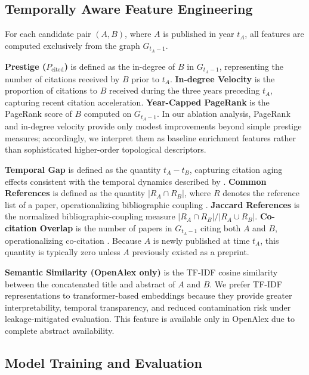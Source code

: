 \documentclass[11pt,a4paper]{article}
\begin{document}
\subsection{Temporally Aware Feature Engineering}

For each candidate pair \((A,B)\), where \(A\) is published in year \(t_A\), all features are computed exclusively from the graph \(G_{t_A-1}\).

\textbf{Prestige (\(P_{\mathrm{cited}}\))} is defined as the in-degree of \(B\) in \(G_{t_A-1}\), representing the number of citations received by \(B\) prior to \(t_A\). \textbf{In-degree Velocity} is the proportion of citations to \(B\) received during the three years preceding \(t_A\), capturing recent citation acceleration. \textbf{Year-Capped PageRank} is the PageRank score of \(B\) computed on \(G_{t_A-1}\). In our ablation analysis, PageRank and in-degree velocity provide only modest improvements beyond simple prestige measures; accordingly, we interpret them as baseline enrichment features rather than sophisticated higher-order topological descriptors.

\textbf{Temporal Gap} is defined as the quantity \(t_A - t_B\), capturing citation aging effects consistent with the temporal dynamics described by \citet{wang2013quantifying}. \textbf{Common References} is defined as the quantity \(|R_A \cap R_B|\), where \(R\) denotes the reference list of a paper, operationalizing bibliographic coupling \citep{kessler1963bibliographic}. \textbf{Jaccard References} is the normalized bibliographic-coupling measure \(|R_A \cap R_B| / |R_A \cup R_B|\). \textbf{Co-citation Overlap} is the number of papers in \(G_{t_A-1}\) citing both \(A\) and \(B\), operationalizing co-citation \citep{small1973co}. Because \(A\) is newly published at time \(t_A\), this quantity is typically zero unless \(A\) previously existed as a preprint.

\textbf{Semantic Similarity (OpenAlex only)} is the TF-IDF cosine similarity between the concatenated title and abstract of \(A\) and \(B\). We prefer TF-IDF representations to transformer-based embeddings because they provide greater interpretability, temporal transparency, and reduced contamination risk under leakage-mitigated evaluation. This feature is available only in OpenAlex due to complete abstract availability.

\subsection{Model Training and Evaluation}
\end{document}
